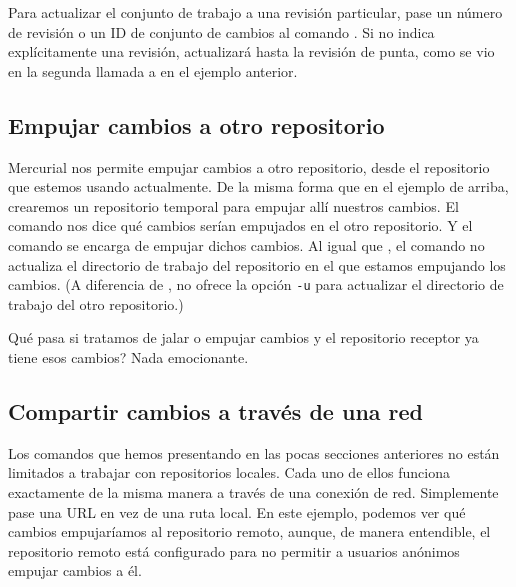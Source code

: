 Para actualizar el conjunto de trabajo a una revisión particular, pase
un número de revisión o un ID de conjunto de cambios al comando
.
Si no indica explícitamente una revisión,  actualizará
hasta la revisión de punta, como se vio en la segunda llamada a
 en el ejemplo anterior.

\subsection{Empujar cambios a otro repositorio}

Mercurial nos permite empujar cambios a otro repositorio, desde el
repositorio que estemos usando actualmente. De la misma forma que en
el ejemplo de  arriba, crearemos un repositorio temporal
para empujar allí nuestros cambios.
El comando  nos dice
qué cambios serían empujados en el otro repositorio.
Y el comando  se encarga de empujar dichos cambios.
Al igual que , el comando  no actualiza el
directorio de trabajo del repositorio en el que estamos empujando los
cambios.  (A diferencia de ,  no ofrece la
opción \texttt{-u} para actualizar el directorio de trabajo del otro
repositorio.)

Qué pasa si tratamos de jalar o empujar cambios y el repositorio
receptor ya tiene esos cambios? Nada emocionante.

\subsection{Compartir cambios a través de una red}

Los comandos que hemos presentando en las pocas secciones anteriores
no están limitados a trabajar con repositorios locales. Cada uno de
ellos funciona exactamente de la misma manera a través de una conexión
de red. Simplemente pase una URL en vez de una ruta local.
En este ejemplo, podemos ver qué cambios empujaríamos al repositorio
remoto, aunque, de manera entendible, el repositorio remoto está
configurado para no permitir a usuarios anónimos empujar cambios a él.

